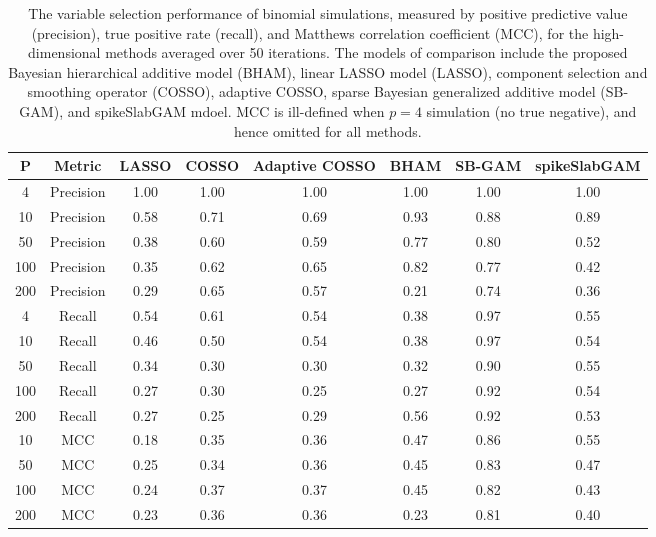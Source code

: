 \begin{table}[ht]
\centering
\begin{tabular}{cccccccc}
  \hline
P & Metric & LASSO & COSSO & Adaptive COSSO & BHAM & SB-GAM & spikeSlabGAM \\ 
  \hline
  4 & Precision & 1.00 & 1.00 & 1.00 & 1.00 & 1.00 & 1.00 \\ 
   10 & Precision & 0.58 & 0.71 & 0.69 & 0.93 & 0.88 & 0.89 \\ 
   50 & Precision & 0.38 & 0.60 & 0.59 & 0.77 & 0.80 & 0.52 \\ 
  100 & Precision & 0.35 & 0.62 & 0.65 & 0.82 & 0.77 & 0.42 \\ 
  200 & Precision & 0.29 & 0.65 & 0.57 & 0.21 & 0.74 & 0.36 \\ 
    4 & Recall & 0.54 & 0.61 & 0.54 & 0.38 & 0.97 & 0.55 \\ 
   10 & Recall & 0.46 & 0.50 & 0.54 & 0.38 & 0.97 & 0.54 \\ 
   50 & Recall & 0.34 & 0.30 & 0.30 & 0.32 & 0.90 & 0.55 \\ 
  100 & Recall & 0.27 & 0.30 & 0.25 & 0.27 & 0.92 & 0.54 \\ 
  200 & Recall & 0.27 & 0.25 & 0.29 & 0.56 & 0.92 & 0.53 \\ 
   10 & MCC & 0.18 & 0.35 & 0.36 & 0.47 & 0.86 & 0.55 \\ 
   50 & MCC & 0.25 & 0.34 & 0.36 & 0.45 & 0.83 & 0.47 \\ 
  100 & MCC & 0.24 & 0.37 & 0.37 & 0.45 & 0.82 & 0.43 \\ 
  200 & MCC & 0.23 & 0.36 & 0.36 & 0.23 & 0.81 & 0.40 \\ 
   \hline
\end{tabular}
\caption{The variable selection performance of binomial simulations,
                         measured by positive predictive value (precision), true positive rate (recall),
                         and Matthews correlation coefficient (MCC), for the high-dimensional methods 
                         averaged over 50 iterations. The models of comparison include the proposed Bayesian
                         hierarchical additive model (BHAM), linear LASSO model (LASSO), component selection and
                         smoothing operator (COSSO), adaptive COSSO, sparse Bayesian generalized additive model (SB-GAM),
                         and spikeSlabGAM mdoel. MCC is ill-defined when $p=4$ simulation (no true negative), and hence omitted for all methods.} 
\label{tab:sim_binom_var_select}
\end{table}
